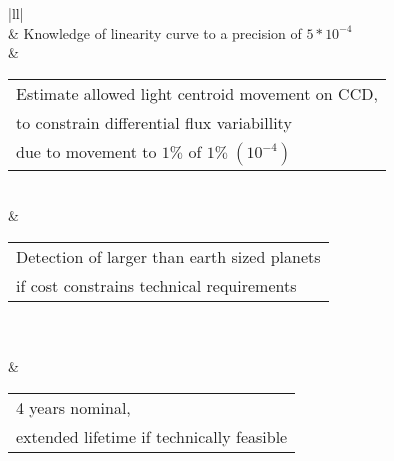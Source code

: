 \documentclass[../main.tex]{subfiles}
\begin{document}
\begin{table}[]
\begin{tabular}{|ll|}
			\rowcolor[HTML]{C0C0C0} 
			                                                                                                                                                                                                                                                                      \\ \hline
			                                                           & Knowledge of linearity curve to a precision of $5*10^{-4}$                                                                                                                                                                                                                      \\ \hline
			 & \begin{tabular}[c]{@{}l@{}}Estimate allowed light centroid movement on CCD,\\ to constrain differential flux variabillity\\ due to movement to $1 \%$ of $1\% \;(10^{-4})$  \end{tabular}                                                                                                                                                                                                           \\ \hline
			                                                               & \begin{tabular}[c]{@{}l@{}}Detection of larger than earth sized planets\\ if cost constrains technical requirements\end{tabular}                                                                                           \\ \hline
			                                                                                                                                                                                                                                                                     \\ \hline
			                                                                        & \begin{tabular}[c]{@{}l@{}}4 years nominal, \\ extended lifetime if technically feasible\end{tabular}                                                                                               \\ \hline

\end{tabular}
\end{table}
\end{document}
